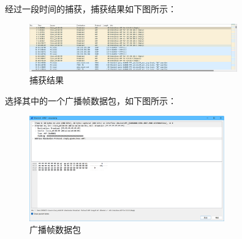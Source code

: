 \documentclass{article}
\begin{document}
经过一段时间的捕获，捕获结果如下图所示：

\begin{figure}[H]
  \centering
  \includegraphics[width=0.8\textwidth]{images/12.png}
  \caption{捕获结果}
\end{figure}

选择其中的一个广播帧数据包，如下图所示：

\begin{figure}[H]
  \centering
  \includegraphics[width=0.75\textwidth]{images/13.png}
  \caption{广播帧数据包}
\end{figure}
\end{document}
